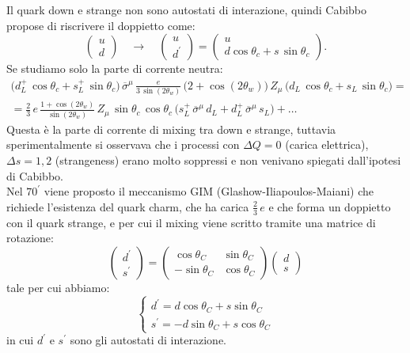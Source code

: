Il quark down e strange non sono autostati di interazione, quindi Cabibbo propose di riscrivere il doppietto come:
\begin{equation}
    \begin{pmatrix}
        u \\
        d
    \end{pmatrix} \quad \longrightarrow \quad \begin{pmatrix}
        u \\
        d^\prime
    \end{pmatrix} = \begin{pmatrix}
        u \\
        d\cos\theta_c + s\, \sin\theta_c
    \end{pmatrix}.
\end{equation}
Se studiamo solo la parte di corrente neutra:
\begin{multline}
    \Big( d_L^+\, \cos\theta_c + s_L^+\, \sin\theta_c \Big)\, \overline{\sigma}^\mu\, \frac{e}{3\, \sin{(2\theta_w)}}\, \Big( 2 + \cos{(2\theta_w)} \Big)\, Z_\mu\, \Big( d_L\, \cos\theta_c + s_L\, \sin\theta_c \Big) = \\
    = \frac{2}{3}\, e\, \frac{1 + \cos{(2\theta_w)}}{\sin{(2\theta_w)}}\, Z_\mu\, \sin\theta_c\, \cos\theta_c\, \Big( s_L^+\, \overline{\sigma}^\mu\, d_L + d_L^+\, \overline{\sigma}^\mu\, s_L \Big) + \dots
\end{multline}
Questa è la parte di corrente di mixing tra down e strange, tuttavia sperimentalmente si osservava che i processi con $\Delta Q= 0$ (carica elettrica), $\Delta s = 1,2$ (strangeness) erano molto soppressi e non venivano spiegati dall'ipotesi di Cabibbo. \\

Nel $70^\prime$ viene proposto il meccanismo GIM (Glashow-Iliapoulos-Maiani) che richiede l'esistenza del quark charm, che ha carica $\frac{2}{3}\, e$ e che forma un doppietto con il quark strange, e per cui il mixing viene scritto tramite una matrice di rotazione:
\begin{equation}
    \begin{pmatrix}
        d^\prime \\
        s^\prime
    \end{pmatrix} = \begin{pmatrix}
        \cos{\theta_C} & \sin{\theta_C} \\
        -\sin{\theta_C} & \cos{\theta_C}
    \end{pmatrix}\begin{pmatrix}
        d \\
        s
    \end{pmatrix}
\end{equation}
tale per cui abbiamo:
\begin{equation}
    \begin{cases}
        d^\prime = d\cos{\theta_C} + s\sin{\theta_C} \\
        s^\prime = -d\sin{\theta_C} + s\cos{\theta_C}
    \end{cases}
\end{equation}
in cui $d^\prime$ e $s^\prime$ sono gli autostati di interazione. \\

